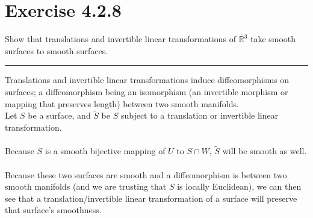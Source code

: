 \documentclass[12pt]{article}
\begin{document}
\maketitle

\section*{Exercise 4.2.8}
\indent

Show that translations and invertible linear transformations of $\mathbb{R}^3$ take smooth surfaces to smooth surfaces.

\vspace{1cm}
\hrule
\vspace{1cm}
\noindent

Translations and invertible linear transformations induce diffeomorphisms on surfaces; a diffeomorphism being an isomorphism (an invertible morphism or mapping that preserves length) between two smooth manifolds. \\

Let $S$ be a surface, and $\widetilde{S}$ be $S$ subject to a translation or invertible linear transformation.\\\\
\indent
Because $S$ is a smooth bijective mapping of $U$ to $S \cap W$, $\widetilde{S}$ will be smooth as well.\\\\
\indent
Because these two surfaces are smooth and a diffeomorphism is between two smooth manifolds (and we are trusting that $S$ is locally Euclidean), we can then see that a translation/invertible linear transformation of a surface will preserve that surface's smoothness.
\end{document}
